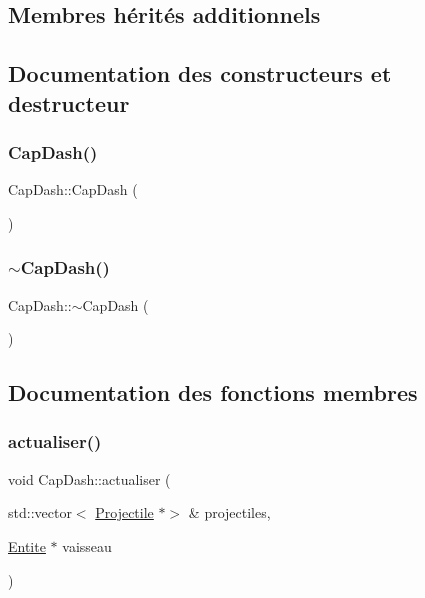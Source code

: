 \subsection*{Membres hérités additionnels}


\subsection{Documentation des constructeurs et destructeur}
\mbox{\label{class_cap_dash_ac38287e31284b6b5ac8add730830bfed}} 
\subsubsection{\texorpdfstring{Cap\+Dash()}{CapDash()}}
{\footnotesize\ttfamily Cap\+Dash\+::\+Cap\+Dash (\begin{DoxyParamCaption}{ }\end{DoxyParamCaption})}

\mbox{\label{class_cap_dash_aa935262b9ebdaf197294aba7211663cc}} 
\subsubsection{\texorpdfstring{$\sim$\+Cap\+Dash()}{~CapDash()}}
{\footnotesize\ttfamily Cap\+Dash\+::$\sim$\+Cap\+Dash (\begin{DoxyParamCaption}{ }\end{DoxyParamCaption})}



\subsection{Documentation des fonctions membres}
\mbox{\label{class_cap_dash_a886522c648db49b81c330737ad96a517}} 
\subsubsection{\texorpdfstring{actualiser()}{actualiser()}}
{\footnotesize\ttfamily void Cap\+Dash\+::actualiser (\begin{DoxyParamCaption}\item[{std\+::vector$<$ \hyperlink{class_projectile}{Projectile} $\ast$$>$ \&}]{projectiles,  }\item[{\hyperlink{class_entite}{Entite} $\ast$}]{vaisseau }\end{DoxyParamCaption})\hspace{0.3cm}{\ttfamily [virtual]}}



